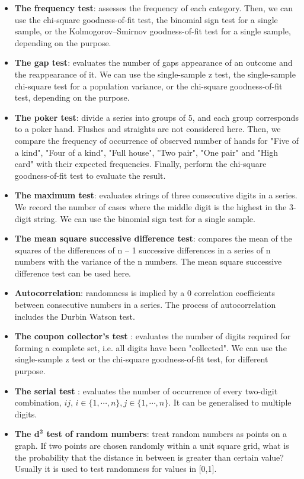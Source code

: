 \documentclass[12pt]{article}
\theoremstyle{plain}
\theoremstyle{definition}
\theoremstyle{remark}
\begin{document}
\begin{itemize}
    \item \textbf{The frequency test}\cite{3.4}: assesses the frequency of each category. Then, we can use the chi-square goodness-of-fit test, the binomial sign test for a single sample, or the Kolmogorov–Smirnov goodness-of-fit test for a single sample, depending on the purpose.\cite{3.4}
    \item \textbf{The gap test}\cite{3.10}\cite{3.11}\cite{3.12}\cite{3.13}\cite{3.14}\cite{3.15}\cite{3.16}: evaluates the number of gaps appearance of an outcome and the reappearance of it. We can use the single-sample z test, the single-sample chi-square test for a population variance, or the chi-square goodness-of-fit test, depending on the purpose.\cite{3.4}
    \item \textbf{The poker test}\cite{3.10}\cite{3.11}\cite{3.12}\cite{3.13}\cite{3.14}\cite{3.15}\cite{3.16}: divide a series into groups of 5, and each group corresponds to a poker hand. Flushes and straights are not considered here. Then, we compare the frequency of occurrence of observed number of hands for "Five of a kind", "Four of a kind", "Full house", "Two pair", "One pair" and "High card" with their expected frequencies. Finally, perform the chi-square goodness-of-fit test to evaluate the result.\cite{3.4}
    \item \textbf{The maximum test}\cite{3.11}: evaluates strings of three consecutive digits in a series. We record the number of cases where the middle digit is the highest in the 3-digit string. We can use the binomial sign test for a single sample.\cite{3.4}
    \item \textbf{The mean square successive difference test}\cite{3.17}\cite{3.18}\cite{3.19}\cite{3.20}\cite{3.9}: compares the mean of the squares of the differences of n – 1 successive differences in a series of n numbers with the variance of the n numbers. The mean square successive difference test can be used here.\cite{3.4}
    \item \textbf{Autocorrelation}\cite{3.4}: randomness is implied by a 0 correlation coefficients between consecutive numbers in a series. The process of autocorrelation includes the Durbin Watson test. \cite{3.20}\cite{3.21}\cite{3.22}\cite{3.23}\cite{3.24}\cite{3.25}
    \item \textbf{The coupon collector's test} \cite{3.4}: evaluates the number of digits required for forming a complete set, i.e. all digits have been "collected". We can use the single-sample z test or the chi-square goodness-of-fit test, for different purpose.\cite{3.4}
    \item \textbf{The serial test} \cite{3.4}: evaluates the number of occurrence of every two-digit combination, $ij$, $i\in \{1,\cdots,n\},j\in \{1,\cdots,n\}$. It can be generalised to multiple digits. \cite{3.26}
    \item \textbf{The $\mathbf{d^2}$ test of random numbers}\cite{3.11}: treat random numbers as points on a graph. If two points are chosen randomly within a unit square grid, what is the probability that the distance in between is greater than certain value? Usually it is used to test randomness for values in [0,1]. \cite{3.4}
\end{itemize}
\end{document}

